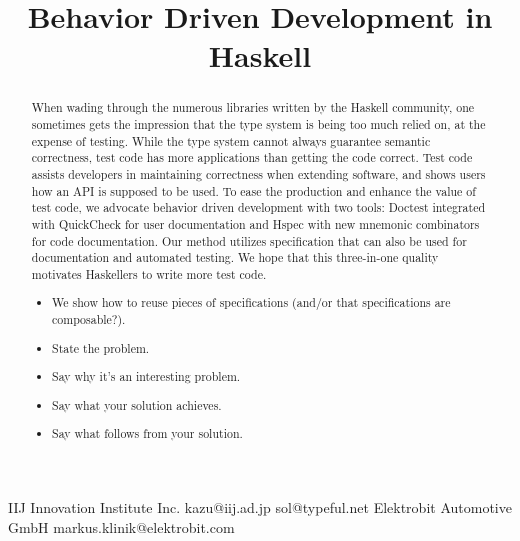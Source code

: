 \documentclass[preprint]{sigplanconf}
\begin{document}
\copyrightdata{[to be supplied]}


\title{Behavior Driven Development in Haskell}

           {IIJ Innovation Institute Inc.}
           {kazu@iij.ad.jp}
           {}
           {sol@typeful.net}
           {Elektrobit Automotive GmbH}
           {markus.klinik@elektrobit.com}

\maketitle

\begin{abstract}

When wading through the numerous libraries written by
the Haskell community, one sometimes gets the impression that the type
system is being too much relied on, at the expense of testing.
While the type system cannot always guarantee semantic correctness,
test code has more applications than getting the code correct.
Test code assists developers in maintaining correctness when extending
software, and shows users how an API is supposed to be used.
To ease the production and enhance the value of test code, we advocate
behavior driven development with two tools:
Doctest integrated with QuickCheck for user documentation and
Hspec with new mnemonic combinators for code documentation.
Our method utilizes specification that can also be used for
documentation and automated testing. We hope that this three-in-one
quality motivates Haskellers to write more test code.

\begin{itemize}
    \item We show how to reuse pieces of specifications (and/or that
        specifications are composable?).
\end{itemize}

\begin{itemize}
    \item State the problem.
    \item Say why it's an interesting problem.
    \item Say what your solution achieves.
    \item Say what follows from your solution.
\end{itemize}

\end{abstract}
\end{document}
